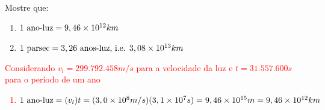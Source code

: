 \begin{prob}
	Mostre que:
	\begin{enumerate}[label=\alph *)]
		\item $1\textnormal{ ano-luz}=9,46\times 10^{12}km$
		\item $1\textnormal{ parsec}=3,26\textnormal{ anos-luz, i.e. }3,08\times10^{13}km$
	\end{enumerate}	
\end{prob}

\textcolor{red}{
	\begin{sol}
		Considerando $v_l=299.792.458m/s$ para a velocidade da luz e $t=31.557.600s$ para o período de um ano
		\begin{enumerate}[label=\alph *)]
			\item $1\textnormal{ ano-luz}=(v_l)t=(3,0\times 10^{8}m/s)(3,1\times 10^{7}s)=9,46\times 10^{15}m=9,46\times 10^{12}km$
		\end{enumerate}
	\end{sol}
}







